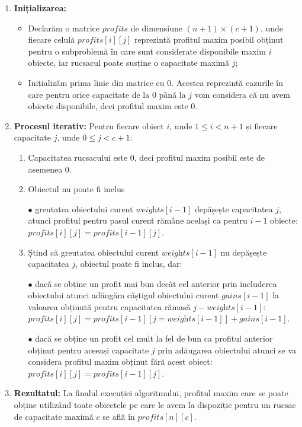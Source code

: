 \begin{sloppypar}
\begin{tcolorbox}[mystyle]
\begin{enumerate}[left=0.2em]
    \item \textbf{Inițializarea:}
    \begin{itemize}
        \item Declarăm o matrice $ \textit{profits} $ de dimensiune $ (n + 1) \times (c + 1) $, unde fiecare celulă $ \textit{profits}[i][j] $ reprezintă profitul maxim posibil obținut pentru o subproblemă în care sunt considerate disponibile maxim $i$ obiecte, iar rucsacul poate susține o capacitate maximă $j$;
        \item Inițializăm prima linie din matrice cu 0. Acestea reprezintă cazurile în care pentru orice capacitate de la 0 până la $j$ vom considera că nu avem obiecte disponibile, deci profitul maxim este 0. 
    \end{itemize}
    \item \textbf{Procesul iterativ:}
    Pentru fiecare obiect $i$, unde $1 \le i < n + 1$ și fiecare capacitate $j$, unde $0 \le j < c + 1$:
    \begin{enumerate}
        \item Capacitatea rucsacului este 0, deci profitul maxim posibil este de asemenea 0.
        \item Obiectul nu poate fi inclus \par
            $\bullet$ greutatea obiectului curent $\textit{weights}[i - 1]$ depășește capacitatea $j$, atunci profitul pentru pasul curent rămâne același ca pentru $i - 1$ obiecte: $\textit{profits}[i][j] = \textit{profits}[i - 1][j]$.
        \item Ștind că greutatea obiectului curent $\textit{weights}[i - 1]$ nu depășește capacitatea $j$, obiectul poate fi inclus, dar: \par
        $\bullet$ dacă se obține un profit mai bun decât cel anterior prin includerea obiectului atunci adăugăm câștigul obiectului curent $\textit{gains}[i - 1]$ la valoarea obținută pentru capacitatea rămasă $j - \textit{weights}[i - 1]$: $\textit{profits}[i][j] = \textit{profits}[i - 1][j = \textit{weights}[i - 1]] + \textit{gains}[i - 1]$. \par
        $\bullet$ dacă se obține un profit cel mult la fel de bun ca profitul anterior obținut pentru aceeași capacitate $j$ prin adăugarea obiectului atunci se va considera profitul maxim obținut fără acest obiect: $\textit{profits}[i][j] = \textit{profits}[i - 1][j]$.
    \end{enumerate}
    \item \textbf{Rezultatul:}
    La finalul execuției algoritmului, profitul maxim care se poate obține utilizând toate obiectele pe care le avem la dispoziție pentru un rucsac de capacitate maximă $c$ se află în $\textit{profits}[n][c]$.
\end{enumerate}
\end{tcolorbox}


\end{sloppypar}
